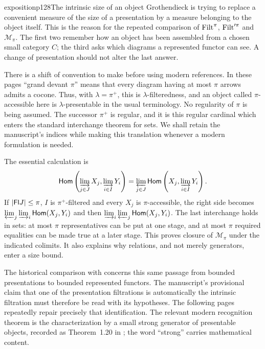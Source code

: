 \begin{dcomment}{exposition}{p128}{The intrinsic size of an object}
Grothendieck is trying to replace a convenient measure of the size of a presentation by a measure belonging to the object itself. This is the reason for the repeated comparison of $\mathrm{Filt}^{\pi}$, $\mathrm{Filt}'^{\pi}$ and $\mathcal M_\pi$. The first two remember how an object has been assembled from a chosen small category $C$; the third asks which diagrams a represented functor can see. A change of presentation should not alter the last answer.

There is a shift of convention to make before using modern references. In these pages ``grand devant $\pi$'' means that every diagram having at most $\pi$ arrows admits a cocone. Thus, with $\lambda=\pi^+$, this is $\lambda$-filteredness, and an object called $\pi$-accessible here is $\lambda$-presentable in the usual terminology. No regularity of $\pi$ is being assumed. The successor $\pi^+$ is regular, and it is this regular cardinal which enters the standard interchange theorem for sets. We shall retain the manuscript's indices while making this translation whenever a modern formulation is needed.

The essential calculation is
\[
 \mathsf{Hom}\left(\varinjlim_{j\in J}X_j,\varinjlim_{i\in I}Y_i\right)
 =\varprojlim_{j\in J}\mathsf{Hom}\left(X_j,\varinjlim_{i\in I}Y_i\right).
\]
If $|\mathsf{Fl} J|\leq\pi$, $I$ is $\pi^+$-filtered and every $X_j$ is $\pi$-accessible, the right side becomes
$\varprojlim_j\varinjlim_i\mathsf{Hom}(X_j,Y_i)$ and then
$\varinjlim_i\varprojlim_j\mathsf{Hom}(X_j,Y_i)$. The last interchange holds in sets: at most $\pi$ representatives can be put at one stage, and at most $\pi$ required equalities can be made true at a later stage. This proves closure of $\mathcal M_\pi$ under the indicated colimits. It also explains why relations, and not merely generators, enter a size bound.

The historical comparison with \citet[Expos\'e~I, \S9]{SGA4I1972} concerns this same passage from bounded presentations to bounded represented functors. The manuscript's provisional claim that one of the presentation filtrations is automatically the intrinsic filtration must therefore be read with its hypotheses. The following pages repeatedly repair precisely that identification. The relevant modern recognition theorem is the characterization by a small strong generator of presentable objects, recorded as Theorem~1.20 in \citet{AdamekRosicky1994}; the word ``strong'' carries mathematical content.
\end{dcomment}


